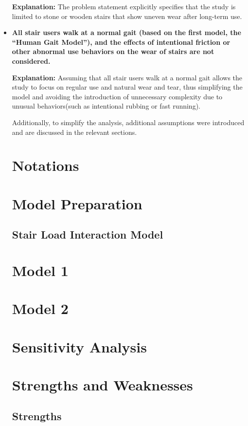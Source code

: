 \documentclass{mcmthesis}
\begin{document}
\begin{itemize}
\textbf{Explanation:}
The problem statement explicitly specifies that the study is limited to stone or wooden stairs that show uneven wear after long-term use.

\item \textbf{All stair users walk at a normal gait (based on the first model, the “Human Gait Model”), and the effects of intentional friction or other abnormal use behaviors on the wear of stairs are not considered.}

\textbf{Explanation:}
Assuming that all stair users walk at a normal gait allows the study to focus on regular use and natural wear and tear, thus simplifying the model and avoiding the introduction of unnecessary complexity due to unusual behaviors(such as intentional rubbing or fast running).


Additionally, to simplify the analysis, additional assumptions were introduced and are discussed in the relevant sections.
\section{Notations}%
\section{Model Preparation}
\subsection{Stair Load Interaction Model}

\subsection{}
\section{Model 1}
\section{Model 2}
\section{Sensitivity Analysis}
\section{Strengths and Weaknesses}%
\subsection{Strengths}

\end{itemize}
\end{document}
